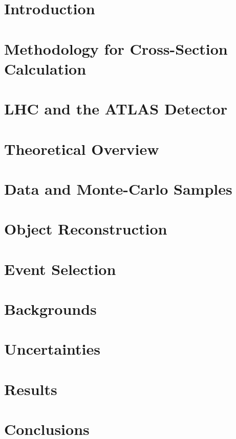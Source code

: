 \chapter{Introduction}
\label{chap:intro}


\chapter{Methodology for Cross-Section Calculation}
\label{chap:method}


\chapter{LHC and the ATLAS Detector}
\label{chap:det}


\chapter{Theoretical Overview}
\label{chap:th}


\chapter{Data and Monte-Carlo Samples}
\label{chap:mc}


\chapter{Object Reconstruction}
\label{chap:perf}


\chapter{Event Selection}
\label{chap:evt}


\chapter{Backgrounds}
\label{chap:bg}

\clearpage

\chapter{Uncertainties}
\label{chap:unc}


\chapter{Results}
\label{chap:res}


\chapter{Conclusions}
\label{chap:conc}

